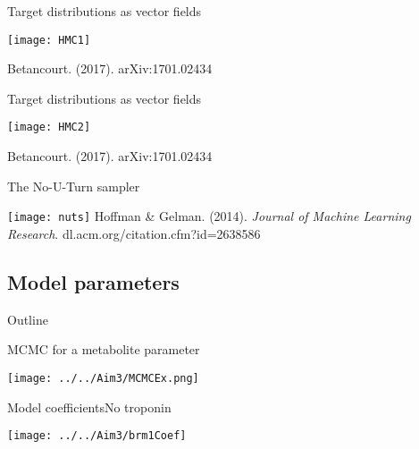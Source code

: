 \documentclass[xcolor=dvipsnames]{beamer}
\begin{document}
\begin{frame}{Target distributions as vector fields}
	\vspace{-5pt}
	\begin{center}
		\texttt{[image: HMC1]}
		
	Betancourt. (2017). arXiv:1701.02434
	\end{center}
\end{frame}

\begin{frame}{Target distributions as vector fields}
	\vspace{-5pt}
	\begin{center}
		\texttt{[image: HMC2]}
		
		Betancourt. (2017). arXiv:1701.02434
	\end{center}
\end{frame}

\begin{frame}{The No-U-Turn sampler}
	\vspace{-10pt}
	\begin{center}
		\texttt{[image: nuts]}
		\vspace{2ex}
		Hoffman \& Gelman. (2014). \emph{Journal of Machine Learning Research}. dl.acm.org/citation.cfm?id=2638586
	\end{center}
\end{frame}

\subsection{Model parameters}
\begin{frame}{Outline}
	\vspace{-10.5pt}
	\tableofcontents[currentsection,subsectionstyle=show/shaded/hide]
\end{frame}

\begin{frame}{MCMC for a metabolite parameter}
	\vspace{-5pt}
	\begin{center}
		\texttt{[image: ../../Aim3/MCMCEx.png]}
	\end{center}
\end{frame}


\begin{frame}{Model coefficients}{No troponin}
	\vspace{-5pt}
	\begin{center}
		\texttt{[image: ../../Aim3/brm1Coef]}
	\end{center}
\end{frame}
\end{document}
